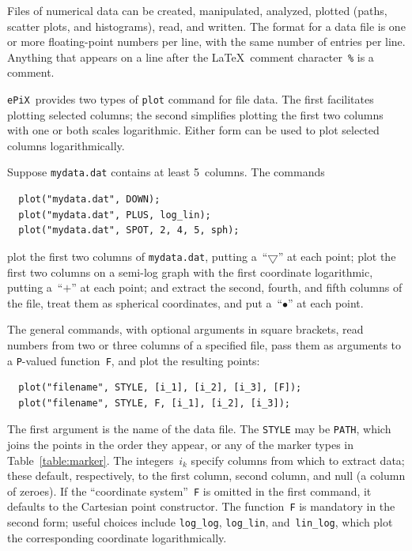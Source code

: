 \documentclass[12pt]{report}
\newcommand{\code}[1]{\texttt{#1}}
\newcommand{\filename}[1]{\texttt{#1}}
\newcommand{\ePiX}{\code{ePiX}}
\begin{document}
Files of numerical data can be created, manipulated, analyzed,
plotted (paths, scatter plots, and histograms), read, and written. 
The format for a data file is one or more floating-point
numbers per line, with the same number of entries per line. Anything
that appears on a line after the \LaTeX\ comment character~\code{\%}
is a comment. 

  \ePiX\
provides two types of \code{plot} command for file data. The first
facilitates plotting selected columns; the second simplifies plotting
the first two columns with one or both scales logarithmic. Either form
can be used to plot selected columns logarithmically.

Suppose \filename{mydata.dat} contains at least 5~columns. The
commands
\begin{verbatim}
  plot("mydata.dat", DOWN);
  plot("mydata.dat", PLUS, log_lin);
  plot("mydata.dat", SPOT, 2, 4, 5, sph);
\end{verbatim}
plot the first two columns of \filename{mydata.dat}, putting
a~``$\bigtriangledown$'' at each point; plot the first two columns on
a semi-log graph with the first coordinate logarithmic, putting
a~``$+$'' at each point; and extract the second, fourth, and fifth
columns of the file, treat them as spherical coordinates, and put
a~``$\bullet$'' at each point.

The general commands, with optional arguments in square brackets,
read numbers from two or three columns of a specified file, pass
them as arguments to a \code{P}-valued function~\code{F}, and plot the
resulting points:
\begin{verbatim}
  plot("filename", STYLE, [i_1], [i_2], [i_3], [F]);
  plot("filename", STYLE, F, [i_1], [i_2], [i_3]);
\end{verbatim}
The first argument is the name of the data file. The \code{STYLE} may
be \code{PATH}, which joins the points in the order they appear, or
any of the marker types\index{Marker types} in
Table~\ref{table:marker}.  The integers~$i_k$ specify columns from
which to extract data; these default, respectively, to the first
column, second column, and null (a column of zeroes). If the
``coordinate system''~\code{F} is omitted in the first command, it
defaults to the Cartesian point constructor. The function~\code{F} is
mandatory in the second form; useful choices include \code{log\_log},
\code{log\_lin}, and~\code{lin\_log}, which plot the corresponding
coordinate logarithmically.
\end{document}
